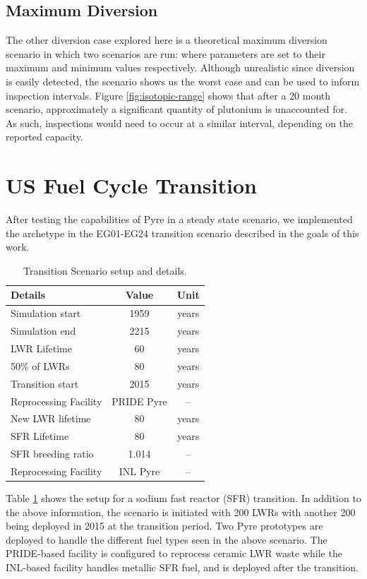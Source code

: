 \subsection{Maximum Diversion}
The other diversion case explored here is a theoretical maximum diversion scenario in which two scenarios are run: where parameters are set to their maximum and minimum values
respectively. Although unrealistic since diversion is easily detected, the scenario shows us the worst case and can be used to inform inspection intervals.
Figure \ref{fig:isotopic-range} shows that after a 20 month scenario, approximately a significant quantity of plutonium is unaccounted for. As such, inspections would need to occur
at a similar interval, depending on the reported capacity.

\section{US Fuel Cycle Transition}

After testing the capabilities of Pyre in a steady state scenario, we implemented the archetype in the EG01-EG24 transition scenario described in the goals of this work. 

\begin{table}[h]
	\centering
	\begin{tabularx}{0.5\linewidth}{lcc}
		\hline
		\textbf{Details} & \textbf{Value} & \textbf{Unit} \\
		\hline \hline
		Simulation start & 1959 & years \\ \hline
		Simulation end & 2215 & years \\ \hline
		LWR Lifetime & 60 & years \\ 
		50\% of LWRs & 80 & years \\ \hline
		Transition start & 2015 & years \\ \hline
		Reprocessing Facility & PRIDE Pyre & -- \\ \hline
		New LWR lifetime & 80 & years \\ \hline
		SFR Lifetime & 80 & years \\ \hline
		SFR breeding ratio & 1.014 & -- \\ \hline
		Reprocessing Facility & INL Pyre & -- \\ \hline
	\end{tabularx}
	\caption {Transition Scenario setup and details.}
	\label {tab:setup}
\end{table}

Table \ref{tab:setup} shows the setup for a sodium fast reactor (SFR) transition. In addition to the above information, the scenario is initiated with 200 LWRs with another 200 being deployed
in 2015 at the transition period. Two Pyre prototypes are deployed to handle the different fuel types seen in the above scenario. The PRIDE-based facility is configured to reprocess ceramic
LWR waste while the INL-based facility handles metallic SFR fuel, and is deployed after the transition. 

